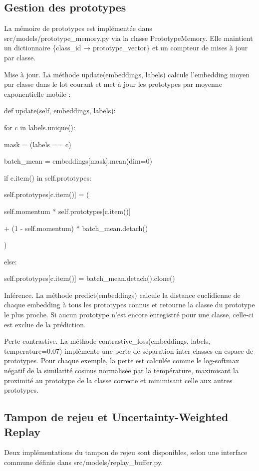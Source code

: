 \subsection{Gestion des prototypes}

La mémoire de prototypes est implémentée dans src/models/prototype\_memory.py via la classe PrototypeMemory. Elle maintient un dictionnaire \{class\_id → prototype\_vector\} et un compteur de mises à jour par classe.

Mise à jour. La méthode update(embeddings, labels) calcule l'embedding moyen par classe dans le lot courant et met à jour les prototypes par moyenne exponentielle mobile :

def update(self, embeddings, labels):

for c in labels.unique():

mask = (labels == c)

batch\_mean = embeddings[mask].mean(dim=0)

if c.item() in self.prototypes:

self.prototypes[c.item()] = (

self.momentum * self.prototypes[c.item()]

+ (1 - self.momentum) * batch\_mean.detach()

)

else:

self.prototypes[c.item()] = batch\_mean.detach().clone()

Inférence. La méthode predict(embeddings) calcule la distance euclidienne de chaque embedding à tous les prototypes connus et retourne la classe du prototype le plus proche. Si aucun prototype n'est encore enregistré pour une classe, celle-ci est exclue de la prédiction.

Perte contrastive. La méthode contrastive\_loss(embeddings, labels, temperature=0.07) implémente une perte de séparation inter-classes en espace de prototypes. Pour chaque exemple, la perte est calculée comme le log-softmax négatif de la similarité cosinus normalisée par la température, maximisant la proximité au prototype de la classe correcte et minimisant celle aux autres prototypes.

\subsection{Tampon de rejeu et Uncertainty-Weighted Replay}

Deux implémentations du tampon de rejeu sont disponibles, selon une interface commune définie dans src/models/replay\_buffer.py.

